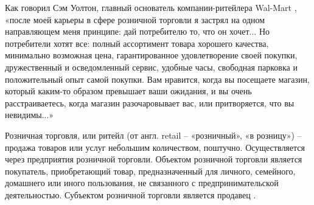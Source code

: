 %
%
%
%
%
%
%
%
%
%
%
%
%
%
%


\label{sec:introduction}

Как говорил Сэм Уолтон, главный основатель компании-ритейлера Wal-Mart \cite{retail_management_review}, «после моей карьеры в сфере розничной торговли я застрял на одном направляющем меня принципе: дай потребителю то, что он хочет... Но потребители хотят все: полный ассортимент товара хорошего качества, минимально возможная цена, гарантированное удовлетворение своей покупки, дружественный и осведомленный сервис, удобные часы, свободная парковка и положительный опыт самой покупки. Вам нравится, когда вы посещаете магазин, который каким-то образом превышает ваши ожидания, и вы очень расстраиваетесь, когда магазин разочаровывает вас, или притворяется, что вы невидимы...»

Розничная торговля, или ритейл (от англ. retail – «розничный», «в розницу») – продажа товаров или услуг небольшим количеством, поштучно. Осуществляется через предприятия розничной торговли. Объектом розничной торговли является покупатель, приобретающий товар, предназначенный для личного, семейного, домашнего или иного пользования, не связанного с предпринимательской деятельностью. Субъектом розничной торговли является продавец \cite{retail_definition}.

